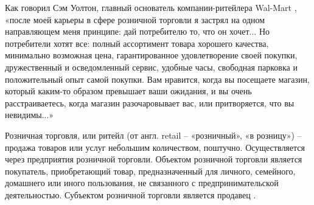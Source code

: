 %
%
%
%
%
%
%
%
%
%
%
%
%
%
%


\label{sec:introduction}

Как говорил Сэм Уолтон, главный основатель компании-ритейлера Wal-Mart \cite{retail_management_review}, «после моей карьеры в сфере розничной торговли я застрял на одном направляющем меня принципе: дай потребителю то, что он хочет... Но потребители хотят все: полный ассортимент товара хорошего качества, минимально возможная цена, гарантированное удовлетворение своей покупки, дружественный и осведомленный сервис, удобные часы, свободная парковка и положительный опыт самой покупки. Вам нравится, когда вы посещаете магазин, который каким-то образом превышает ваши ожидания, и вы очень расстраиваетесь, когда магазин разочаровывает вас, или притворяется, что вы невидимы...»

Розничная торговля, или ритейл (от англ. retail – «розничный», «в розницу») – продажа товаров или услуг небольшим количеством, поштучно. Осуществляется через предприятия розничной торговли. Объектом розничной торговли является покупатель, приобретающий товар, предназначенный для личного, семейного, домашнего или иного пользования, не связанного с предпринимательской деятельностью. Субъектом розничной торговли является продавец \cite{retail_definition}.

